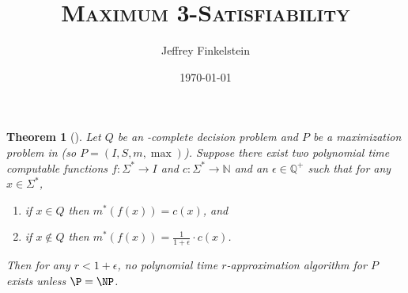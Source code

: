\documentclass[]{article}
\author{Jef{}frey Finkelstein}
\date{\today}
\title{\texorpdfstring{\textsc{Maximum 3-Satisfiability}}{Maximum 3-Satisfiability}}
\theoremstyle{plain}
\newtheorem{theorem}{Theorem}
\begin{document}
\maketitle

\begin{theorem}[{\cite[Theorem~3.7]{book}}]
  Let $Q$ be an \NP-complete decision problem and $P$ be a maximization problem in \NPO{} (so $P=(I, S, m, \max)$).
  Suppose there exist two polynomial time computable functions $f\colon\Sigma^*\to I$ and $c\colon \Sigma^*\to\mathbb{N}$ and an $\epsilon\in\mathbb{Q}^+$ such that for any $x\in\Sigma^*$,
  \begin{enumerate}
  \item if $x \in Q$ then $m^*(f(x)) = c(x)$, and
  \item if $x \notin Q$ then $m^*(f(x)) = \frac{1}{1 + \epsilon} \cdot c(x)$.
  \end{enumerate}
  Then for any $r < 1 + \epsilon$, no polynomial time $r$-approximation algorithm for $P$ exists unless $\P=\NP$.
\end{theorem}
\end{document}
